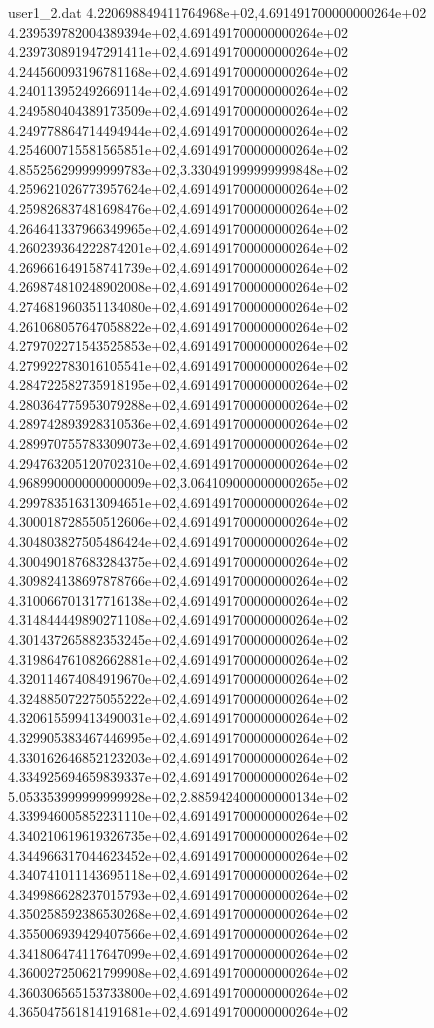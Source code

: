 \begin{filecontents}{user1_2.dat}
4.220698849411764968e+02,4.691491700000000264e+02
4.239539782004389394e+02,4.691491700000000264e+02
4.239730891947291411e+02,4.691491700000000264e+02
4.244560093196781168e+02,4.691491700000000264e+02
4.240113952492669114e+02,4.691491700000000264e+02
4.249580404389173509e+02,4.691491700000000264e+02
4.249778864714494944e+02,4.691491700000000264e+02
4.254600715581565851e+02,4.691491700000000264e+02
4.855256299999999783e+02,3.330491999999999848e+02
4.259621026773957624e+02,4.691491700000000264e+02
4.259826837481698476e+02,4.691491700000000264e+02
4.264641337966349965e+02,4.691491700000000264e+02
4.260239364222874201e+02,4.691491700000000264e+02
4.269661649158741739e+02,4.691491700000000264e+02
4.269874810248902008e+02,4.691491700000000264e+02
4.274681960351134080e+02,4.691491700000000264e+02
4.261068057647058822e+02,4.691491700000000264e+02
4.279702271543525853e+02,4.691491700000000264e+02
4.279922783016105541e+02,4.691491700000000264e+02
4.284722582735918195e+02,4.691491700000000264e+02
4.280364775953079288e+02,4.691491700000000264e+02
4.289742893928310536e+02,4.691491700000000264e+02
4.289970755783309073e+02,4.691491700000000264e+02
4.294763205120702310e+02,4.691491700000000264e+02
4.968990000000000009e+02,3.064109000000000265e+02
4.299783516313094651e+02,4.691491700000000264e+02
4.300018728550512606e+02,4.691491700000000264e+02
4.304803827505486424e+02,4.691491700000000264e+02
4.300490187683284375e+02,4.691491700000000264e+02
4.309824138697878766e+02,4.691491700000000264e+02
4.310066701317716138e+02,4.691491700000000264e+02
4.314844449890271108e+02,4.691491700000000264e+02
4.301437265882353245e+02,4.691491700000000264e+02
4.319864761082662881e+02,4.691491700000000264e+02
4.320114674084919670e+02,4.691491700000000264e+02
4.324885072275055222e+02,4.691491700000000264e+02
4.320615599413490031e+02,4.691491700000000264e+02
4.329905383467446995e+02,4.691491700000000264e+02
4.330162646852123203e+02,4.691491700000000264e+02
4.334925694659839337e+02,4.691491700000000264e+02
5.053353999999999928e+02,2.885942400000000134e+02
4.339946005852231110e+02,4.691491700000000264e+02
4.340210619619326735e+02,4.691491700000000264e+02
4.344966317044623452e+02,4.691491700000000264e+02
4.340741011143695118e+02,4.691491700000000264e+02
4.349986628237015793e+02,4.691491700000000264e+02
4.350258592386530268e+02,4.691491700000000264e+02
4.355006939429407566e+02,4.691491700000000264e+02
4.341806474117647099e+02,4.691491700000000264e+02
4.360027250621799908e+02,4.691491700000000264e+02
4.360306565153733800e+02,4.691491700000000264e+02
4.365047561814191681e+02,4.691491700000000264e+02

\end{filecontents}
